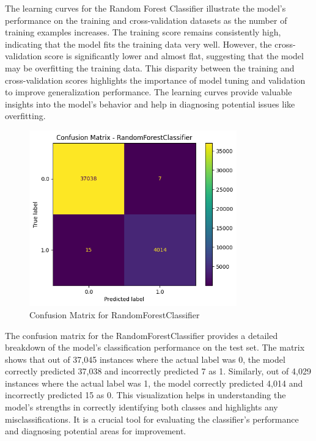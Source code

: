 \documentclass{article}
\begin{document}
The learning curves for the Random Forest Classifier illustrate the model's performance on the training and cross-validation datasets as the number of training examples increases. The training score remains consistently high, indicating that the model fits the training data very well. However, the cross-validation score is significantly lower and almost flat, suggesting that the model may be overfitting the training data. This disparity between the training and cross-validation scores highlights the importance of model tuning and validation to improve generalization performance. The learning curves provide valuable insights into the model's behavior and help in diagnosing potential issues like overfitting.

\begin{figure}[H]
    \centering
    \includegraphics[width=0.8\textwidth]{images/confusion_matrix.png} %
    \caption{Confusion Matrix for RandomForestClassifier}
    \label{fig:confusion_matrix}
\end{figure}

The confusion matrix for the RandomForestClassifier provides a detailed breakdown of the model's classification performance on the test set. The matrix shows that out of 37,045 instances where the actual label was 0, the model correctly predicted 37,038 and incorrectly predicted 7 as 1. Similarly, out of 4,029 instances where the actual label was 1, the model correctly predicted 4,014 and incorrectly predicted 15 as 0. This visualization helps in understanding the model's strengths in correctly identifying both classes and highlights any misclassifications. It is a crucial tool for evaluating the classifier's performance and diagnosing potential areas for improvement.
\end{document}
